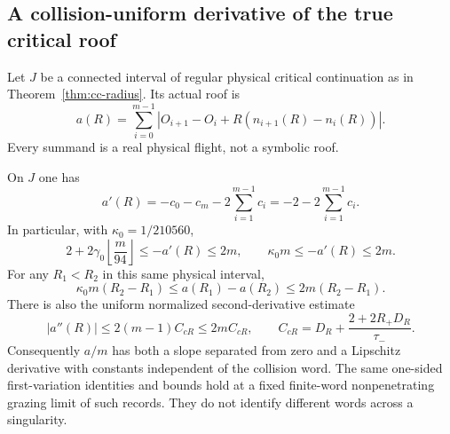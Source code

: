 \subsection{A collision-uniform derivative of the true critical roof}
Let $J$ be a connected interval of regular physical critical
continuation as in Theorem~\ref{thm:cc-radius}.  Its actual roof is
\[
 a(R)=\sum_{i=0}^{m-1}
  |O_{i+1}-O_i+R(n_{i+1}(R)-n_i(R))|.
\]
Every summand is a real physical flight, not a symbolic roof.

\begin{theorem}
\label{thm:cc-clock}
On $J$ one has
\begin{equation}\label{eq:cc-hadamard}
 a'(R)=-c_0-c_m-2\sum_{i=1}^{m-1}c_i
       =-2-2\sum_{i=1}^{m-1}c_i.
\end{equation}
In particular, with $\kappa_0=1/210560$,
\begin{equation}\label{eq:cc-slope}
 2+2\gamma_0\left\lfloor\frac m{94}\right\rfloor
       \leq -a'(R)\leq2m,
 \qquad \kappa_0 m\leq-a'(R)\leq2m.
\end{equation}
For any $R_1<R_2$ in this same physical interval,
\begin{equation}\label{eq:cc-clock-comparison}
 \kappa_0 m(R_2-R_1)
 \leq a(R_1)-a(R_2)\leq2m(R_2-R_1).
\end{equation}
There is also the uniform normalized second-derivative estimate
\begin{equation}\label{eq:cc-second}
 |a''(R)|\leq2(m-1)C_{cR}\leq2mC_{cR},\qquad
 C_{cR}=D_R+\frac{2+2R_+D_R}{\tau_-}.
\end{equation}
Consequently $a/m$ has both a slope separated from zero and a
Lipschitz derivative with constants independent of the collision word.
The same one-sided first-variation identities and bounds hold at a
fixed finite-word nonpenetrating grazing limit of such records.
They do not identify different words across a singularity.
\end{theorem}
